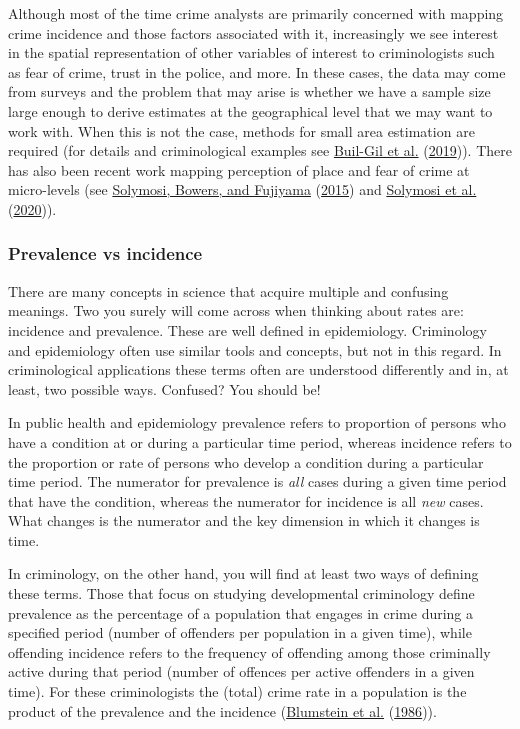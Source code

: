 \documentclass[
  krantz2]{krantz}
\begin{document}
Although most of the time crime analysts are primarily concerned with mapping crime incidence and those factors associated with it, increasingly we see interest in the spatial representation of other variables of interest to criminologists such as fear of crime, trust in the police, and more. In these cases, the data may come from surveys and the problem that may arise is whether we have a sample size large enough to derive estimates at the geographical level that we may want to work with. When this is not the case, methods for small area estimation are required (for details and criminological examples see \protect\hyperlink{ref-Buil_2019}{Buil-Gil et al.} (\protect\hyperlink{ref-Buil_2019}{2019})). There has also been recent work mapping perception of place and fear of crime at micro-levels (see \protect\hyperlink{ref-Solymosi_2015}{Solymosi, Bowers, and Fujiyama} (\protect\hyperlink{ref-Solymosi_2015}{2015}) and \protect\hyperlink{ref-Solymosi_2020}{Solymosi et al.} (\protect\hyperlink{ref-Solymosi_2020}{2020})).

\hypertarget{prevalence-vs-incidence}{%
\subsubsection{Prevalence vs incidence}\label{prevalence-vs-incidence}}

There are many concepts in science that acquire multiple and confusing meanings. Two you surely will come across when thinking about rates are: incidence and prevalence. These are well defined in epidemiology. Criminology and epidemiology often use similar tools and concepts, but not in this regard. In criminological applications these terms often are understood differently and in, at least, two possible ways. Confused? You should be!

In public health and epidemiology prevalence refers to proportion of persons who have a condition at or during a particular time period, whereas incidence refers to the proportion or rate of persons who develop a condition during a particular time period. The numerator for prevalence is \emph{all} cases during a given time period that have the condition, whereas the numerator for incidence is all \emph{new} cases. What changes is the numerator and the key dimension in which it changes is time.

In criminology, on the other hand, you will find at least two ways of defining these terms. Those that focus on studying developmental criminology define prevalence as the percentage of a population that engages in crime during a specified period (number of offenders per population in a given time), while offending incidence refers to the frequency of offending among those criminally active during that period (number of offences per active offenders in a given time). For these criminologists the (total) crime rate in a population is the product of the prevalence and the incidence (\protect\hyperlink{ref-Blumstein_1986}{Blumstein et al.} (\protect\hyperlink{ref-Blumstein_1986}{1986})).
\end{document}

